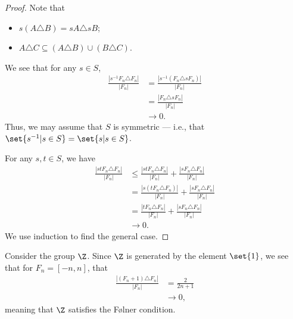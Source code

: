 \begin{proof}
  Note that
  \begin{itemize}
    \item $s\left(A\triangle B\right) = sA\triangle sB$;
    \item $A\triangle C \subseteq \left(A\triangle B\right) \cup \left(B\triangle C\right)$.
  \end{itemize}
  We see that for any $s\in S$,
  \begin{align*}
    \frac{\left\vert s^{-1}F_n\triangle F_n \right\vert}{\left\vert F_n \right\vert} &= \frac{\left\vert s^{-1}\left(F_n\triangle sF_n\right) \right\vert}{\left\vert F_n \right\vert}\\
                                                                                     &= \frac{\left\vert F_n\triangle sF_n \right\vert}{\left\vert F_n \right\vert}\\
                                                                                     &\rightarrow 0.
  \end{align*}
  Thus, we may assume that $S$ is symmetric --- i.e., that $\set{s^{-1}| s\in S} = \set{s | s\in S}$.\newline

  For any $s,t\in S$, we have
  \begin{align*}
    \frac{\left\vert stF_n\triangle F_n \right\vert}{\left\vert F_n \right\vert} &\leq \frac{\left\vert stF_n\triangle F_n \right\vert}{\left\vert F_n \right\vert} + \frac{\left\vert sF_n\triangle F_n \right\vert}{\left\vert F_n \right\vert}\\
                                                                                 &= \frac{\left\vert s\left(tF_n\triangle F_n\right) \right\vert}{\left\vert F_n \right\vert} + \frac{\left\vert sF_n\triangle F_n \right\vert}{\left\vert F_n \right\vert}\\
                                                                                 &= \frac{\left\vert tF_n\triangle F_n \right\vert}{\left\vert F_n \right\vert} + \frac{\left\vert sF_n\triangle F_n \right\vert}{\left\vert F_n \right\vert}\\
                                                                                 &\rightarrow 0.
  \end{align*}
  We use induction to find the general case.
\end{proof}
\begin{example}
  Consider the group $\Z$. Since $\Z$ is generated by the element $\set{1}$, we see that for $F_n = [-n,n]$, that
  \begin{align*}
    \frac{\left\vert \left(F_n + 1\right)\triangle F_n \right\vert}{\left\vert F_n \right\vert} &= \frac{2}{2n+1}\\
                                                                                                &\rightarrow 0,
  \end{align*}
  meaning that $\Z$ satisfies the Følner condition.
\end{example}
